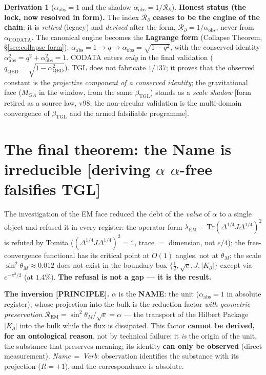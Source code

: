 \documentclass[11pt]{article}
\newcommand{\bTGL}{\beta_{\mathrm{TGL}}}\newcommand{\Msun}{M_{\odot}}\newcommand{\TGL}{\mathrm{TGL}}
\theoremstyle{definition}\newtheorem{deriv}{Derivation}
\begin{document}
\begin{deriv}[$\alpha_{\mathrm{abs}}=1$ and the shadow $\alpha_{\mathrm{obs}}=1/\mathcal{R}_\partial$]
\textbf{Honest status (the lock, now resolved in form).} The index $\mathcal{R}_\partial$ \textbf{ceases to be the engine of the chain}: it is \emph{retired} (legacy) and \emph{derived} after the form, $\mathcal{R}_\partial=1/\alpha_{\mathrm{obs}}$, never from $\alpha_{\mathrm{CODATA}}$. The canonical engine becomes the \textbf{Lagrange form} (Collapse Theorem, \S\ref{sec:collapse-form}): $\alpha_{\mathrm{abs}}=1\to q\to\alpha_{\mathrm{obs}}=\sqrt{1-q^2}$, with the conserved identity $\alpha_{\mathrm{abs}}^2=q^2+\alpha_{\mathrm{obs}}^2=1$. CODATA enters \emph{only} in the final validation ($q_{\mathrm{QED}}=\sqrt{1-\alpha_{\mathrm{QED}}^2}$). TGL does not fabricate $1/137$; it proves that the observed constant is the \emph{projective component of a conserved identity}; the gravitational face ($M_{GA}$ in the window, from the same $\bTGL$) stands as a \emph{scale shadow} [form retired as a source law, v98; the non-circular validation is the multi-domain convergence of $\bTGL$ and the armed falsifiable programme].\end{deriv}

\section{The final theorem: the Name is irreducible \textsf{[deriving $\alpha$ $\alpha$-free falsifies TGL]}}\label{sec:name-irreducible}

The investigation of the EM face reduced the debt of the \emph{value} of $\alpha$ to a single object and refused it in every register: the operator form $\lambda_{\mathrm{EM}}=\mathrm{Tr}(\Delta^{1/4}J\Delta^{1/4})^2$ is refuted by Tomita ($(\Delta^{1/4}J\Delta^{1/4})^2=\mathbb{1}$, trace $=$ dimension, not $e/4$); the free-convergence functional has its critical point at $O(1)$ angles, not at $\theta_M$; the scale $\sin^2\theta_M\approx0.012$ does not exist in the boundary box $\{\tfrac12,\sqrt e, J, |K_\partial|\}$ except via $e^{-\pi^2/2}$ (at $1.4\%$). \textbf{The refusal is not a gap --- it is the result.}

\textbf{The inversion \textsf{[PRINCIPLE]}.} $\alpha$ is the \textbf{NAME}: the unit ($\alpha_{\mathrm{abs}}=1$ in absolute register), whose projection into the bulk is the reduction factor \emph{with geometric preservation} $\mathcal{R}_{\mathrm{EM}}=\sin^2\theta_M/\sqrt e=\alpha$ --- the transport of the Hilbert Package $|K_\partial|$ into the bulk while the flux is dissipated. This factor \textbf{cannot be derived, for an ontological reason}, not by technical failure: it \emph{is} the origin of the unit, the substance that preserves meaning; its identity \textbf{can only be observed} (direct measurement). \emph{Name$\,=\,$Verb}: observation identifies the substance with its projection ($R=+1$), and the correspondence is absolute.
\end{document}
